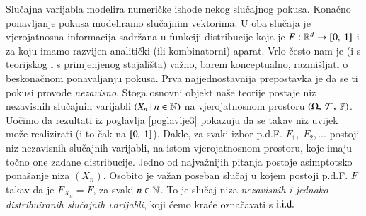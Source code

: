 \begin{nap} \label{nap:9.12}
    Slu\v cajna varijabla modelira numeri\v cke ishode nekog slu\v cajnog pokusa.
    Kona\v cno ponavljanje pokusa modeliramo slu\v cajnim vektorima.
    U oba slu\v caja je vjerojatnosna informacija sadr\v zana u funkciji distribucije koja je $F: \mathbb{R}^d \to [{0}, \:{1}]$ i za koju imamo razvijen analiti\v cki (ili kombinatorni) aparat.
    Vrlo \v cesto nam je (i s teorijskog i s primjenjenog stajali\v sta) va\v zno, barem konceptualno, razmi\v sljati o beskona\v cnom ponavaljanju pokusa.
    Prva najjednostavnija prepostavka je da se ti pokusi provode \emph{nezavisno}.
    Stoga osnovni objekt na\v se teorije postaje niz nezavisnih slu\v cajnih varijabli $({X_n} \: | \: {n \in \mathbb{N}})$ na vjerojatnosnom prostoru $(\Omega, \: \mathcal{F}, \: \mathbb{P})$.
    Uo\v cimo da rezultati iz poglavlja \ref{poglavlje3} pokazuju da se takav niz uvijek mo\v ze realizirati (i to \v cak na $[{0}, \:{1}]$).
    Dakle, za svaki izbor p.d.F. $F_1, \; F_2, \ldots$ postoji niz nezavisnih slu\v cajnih varijabli, na istom vjerojatnosnom prostoru, koje imaju to\v cno one zadane distribucije.
    Jedno od najva\v znijih pitanja postoje asimptotsko pona\v sanje niza $(X_n)$.
    Osobito je va\v zan poseban slu\v caj u kojem postoji p.d.F. $F$ takav da je $F_{X_n} = F$, za svaki $n \in \mathbb{N}$.
    To je slu\v caj niza \emph{nezavisnih i jednako distribuiranih slu\v cajnih varijabli}, koji \' cemo kra\' ce ozna\v cavati s $\mathrm{i.i.d.}$
\end{nap}